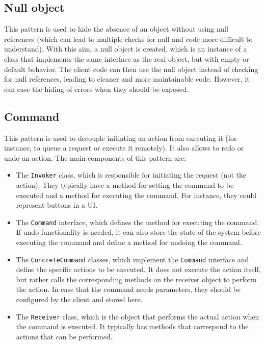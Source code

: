 \subsection{Null object}

This pattern is used to hide the absence of an object without using null references (which can lead to multiple checks for null and code more difficult to understand). With this aim, a null object is created, which is an instance of a class that implements the same interface as the real object, but with empty or default behavior. The client code can then use the null object instead of checking for null references, leading to cleaner and more maintainable code. However, it can ease the hiding of errors when they should be exposed.

\subsection{Command}

This pattern is used to decouple initiating an action from executing it (for instance, to queue a request or execute it remotely). It also allows to redo or undo an action. The main components of this pattern are:
\begin{itemize}
    \item The \texttt{Invoker} class, which is responsible for initiating the request (not the action). They typically have a method for setting the command to be executed and a method for executing the command. For instance, they could represent buttons in a UI.
    \item The \texttt{Command} interface, which defines the method for executing the command. If undo functionality is needed, it can also store the state of the system before executing the command and define a method for undoing the command.
    \item The \texttt{ConcreteCommand} classes, which implement the \texttt{Command} interface and define the specific actions to be executed. It does not execute the action itself, but rather calls the corresponding methods on the receiver object to perform the action. In case that the command needs parameters, they should be configured by the client and stored here.
    \item The \texttt{Receiver} class, which is the object that performs the actual action when the command is executed. It typically has methods that correspond to the actions that can be performed.
\end{itemize}

